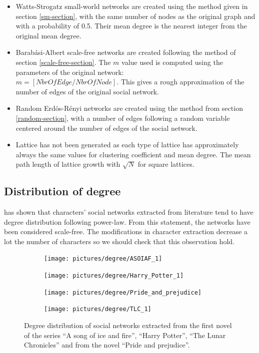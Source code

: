\documentclass[a4paper, 12pt]{report}
\begin{document}
\begin{itemize}
\item Watts-Strogatz small-world networks are created using the method given in section \ref{sm-section}, with the same number of nodes as the original graph and with a probability of 0.5. Their mean degree is the nearest integer from the original mean degree.
\item Barabási-Albert scale-free networks are created following the method of section \ref{scale-free-section}. The $m$ value used is computed using the parameters of the original network:\\
$m = [NbrOfEdge / NbrOfNode]$. This gives a rough approximation of the number of edges of the original social network.
\item Random Erdös-Rényi networks are created using the method from section \ref{random-section}, with a number of edges following a random variable centered around the number of edges of the social network.
\item Lattice has not been generated as each type of lattice has approximately always the same values for clustering coefficient and mean degree. The mean path length of lattice growth with $\sqrt{N}$ for square lattices.
\end{itemize}

\subsection{Distribution of degree}
\cite{original} has shown that characters' social networks extracted from literature tend to have degree distribution following power-law. From this statement, the networks have been considered scale-free. The modifications in character extraction decrease a lot the number of characters so we should check that this observation hold.\\

\begin{figure}
\begin{subfigure}{.49\textwidth}
\centering
\texttt{[image: pictures/degree/ASOIAF\_1]}
\end{subfigure}
\hfill
\begin{subfigure}{.49\textwidth}
\centering
\texttt{[image: pictures/degree/Harry\_Potter\_1]}
\end{subfigure}
\hfill
\begin{subfigure}{.49\textwidth}
\centering
\texttt{[image: pictures/degree/Pride\_and\_prejudice]}
\end{subfigure}
\begin{subfigure}{.49\textwidth}
\centering
\texttt{[image: pictures/degree/TLC\_1]}
\end{subfigure}
\caption{Degree distribution of social networks extracted from the first novel of the series ``A song of ice and fire'', ``Harry Potter'', ``The Lunar Chronicles'' and from the novel ``Pride and prejudice''.}
\label{distrib_degree_4_novels}
\end{figure}
\end{document}
